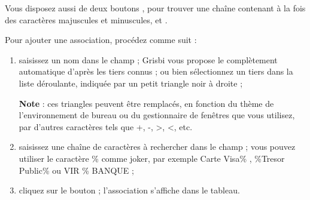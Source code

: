 
Vous disposez aussi de deux boutons , pour trouver une chaîne contenant à la fois des caractères majuscules et minuscules, et .



\ifIllustration
\fi


Pour ajouter une association, procédez comme suit :
\begin{enumerate}
	\item saisissez un nom dans le champ  ; Grisbi vous propose le complètement automatique d'après les tiers connus ; ou bien sélectionnez un tiers dans la liste déroulante, indiquée par un petit triangle noir à droite ;
	
			\textbf{Note} : ces triangles peuvent être remplacés, en fonction du thème de l'environnement de bureau ou du gestionnaire de fenêtres que vous utilisez, par d'autres caractères tels que +, -, >, <, etc.
	\item saisissez une chaîne de caractères à rechercher dans le champ  ; vous pouvez utiliser le caractère \og \% \fg{} comme joker, par exemple \og Carte Visa\% \fg{}, \og\%Tresor Public\% \fg{} ou \og VIR \% BANQUE \fg{} ;
	\item cliquez sur le bouton  ; l'association s'affiche dans le tableau.
\end{enumerate}


